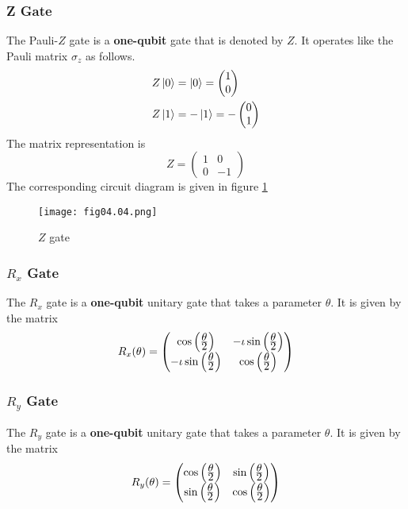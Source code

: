 \subsubsection*{Z Gate}
The Pauli-$Z$ gate is a \textbf{one-qubit} gate that is denoted by $Z$. It operates like the Pauli matrix $\sigma_z$ as follows.
\begin{equation*}
\begin{split}
Z\left\vert 0\right\rangle&=\left\vert 0\right\rangle=
\begin{pmatrix}
1\\
0
\end{pmatrix}\\
Z\left\vert 1\right\rangle&=-\left\vert 1\right\rangle=
-\begin{pmatrix}
0\\
1
\end{pmatrix}\\
\end{split}
\end{equation*}
The matrix representation is
\begin{equation*}
Z=
\begin{pmatrix}
1&0\\
0&-1
\end{pmatrix}
\end{equation*}
The corresponding circuit diagram is given in figure \ref{Fig:4.4}
\begin{figure}[!htb]
   \begin{minipage}{\textwidth}
     \centering
     \texttt{[image: fig04.04.png]}
     \caption{$Z$ gate}
     \label{Fig:4.4}
   \end{minipage}
\end{figure}

\subsubsection*{$R_x$ Gate}
The $R_x$ gate is a \textbf{one-qubit} unitary gate that takes a parameter $\theta$. It is given by the matrix 
\begin{equation*}
R_x(\theta)=
\begin{pmatrix}
\cos\left(\frac{\displaystyle \theta}{\displaystyle 2}\right)&-\iota \sin\left(\frac{\displaystyle \theta}{\displaystyle 2}\right)\\
-\iota \sin\left(\frac{\displaystyle \theta}{\displaystyle 2}\right)&\cos\left(\frac{\displaystyle \theta}{\displaystyle 2}\right)
\end{pmatrix}
\end{equation*}

\subsubsection*{$R_y$ Gate}
The $R_y$ gate is a \textbf{one-qubit} unitary gate that takes a parameter $\theta$. It is given by the matrix 
\begin{equation*}
R_y(\theta)=
\begin{pmatrix}
\cos\left(\frac{\displaystyle \theta}{\displaystyle 2}\right)&\sin\left(\frac{\displaystyle \theta}{\displaystyle 2}\right)\\
\sin\left(\frac{\displaystyle \theta}{\displaystyle 2}\right)&\cos\left(\frac{\displaystyle \theta}{\displaystyle 2}\right)
\end{pmatrix}
\end{equation*}

